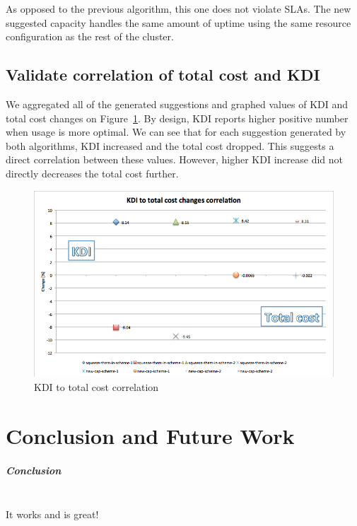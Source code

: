 \documentclass[]{final_report}
\newcommand{\myparagraph}[1]{\paragraph{#1}\mbox{}\\}
\begin{document}
As opposed to the previous algorithm, this one does not violate SLAs. The new suggested capacity handles the same amount of uptime using the same resource configuration as the rest of the cluster. 


\section{Validate correlation of total cost and KDI}

We aggregated all of the generated suggestions and graphed values of KDI and total cost changes on Figure~\ref{fig:kdi_to_cost}. 
By design, KDI reports higher positive number when usage is more optimal. We can see that for each suggestion generated by both algorithms, KDI increased and the total cost dropped. This suggests a direct correlation between these values. However, higher KDI increase did not directly decreases the total cost further.  

\begin{figure}[H]
	\includegraphics[width=\linewidth]{figures/kdi_to_cost}
	\caption{KDI to total cost correlation}
	\label{fig:kdi_to_cost}
\end{figure}


\chapter{Conclusion and Future Work}

\myparagraph{Conclusion}
It works and is great!
\end{document}
